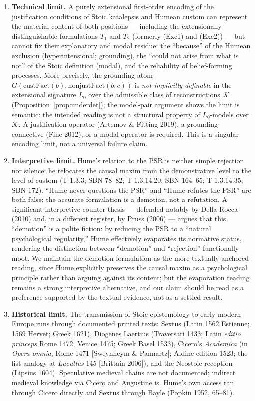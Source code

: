 \documentclass[11pt]{article}
\theoremstyle{plain}
\theoremstyle{definition}
\theoremstyle{remark}
\begin{document}
\begin{enumerate}
\item \textbf{Technical limit.} A purely extensional first-order
encoding of the justification conditions of Stoic katalepsis and Humean
custom can represent the material content of both positions ---
including the extensionally distinguishable formulations $T_1$ and
$T_2$ (formerly (Exc1) and (Exc2)) --- but cannot fix their explanatory
and modal residue: the ``because'' of the Humean exclusion
(hyperintensional; grounding), the ``could not arise from what is
not'' of the Stoic definition (modal), and the reliability of
belief-forming processes. More precisely, the grounding atom
$G(\mathrm{custFact}(b),\mathrm{nonjustFact}(b,c))$ is \emph{not
implicitly definable} in the extensional signature $L_0$ over the
admissible class of reconstructions $\mathcal K$
(Proposition~\ref{prop:underdet}); the model-pair argument shows the
limit is semantic: the intended reading is not a structural property of
$L_0$-models over $\mathcal K$. A justification operator (Artemov \&
Fitting 2019), a grounding connective (Fine 2012), or a modal operator
is required. This is a singular encoding limit, not a universal failure
claim.
\item \textbf{Interpretive limit.} Hume's relation to the PSR is
neither simple rejection nor silence: he relocates the causal maxim
from the demonstrative level to the level of custom (T 1.3.3; SBN
78--82; T 1.3.14.20; SBN 164--65; T 1.3.14.35; SBN 172). ``Hume never
questions the PSR'' and ``Hume refutes the PSR'' are both false; the
accurate formulation is a demotion, not a refutation. A significant
interpretive counter-thesis --- defended notably by Della Rocca (2010)
and, in a different register, by Pruss (2006) --- argues that this
``demotion'' is a polite fiction: by reducing the PSR to a ``natural
psychological regularity,'' Hume effectively evaporates its normative
status, rendering the distinction between ``demotion'' and
``rejection'' functionally moot. We maintain the demotion formulation
as the more textually anchored reading, since Hume explicitly preserves
the causal maxim as a psychological principle rather than arguing
against its content; but the evaporation reading remains a strong
interpretive alternative, and our claim should be read as a preference
supported by the textual evidence, not as a settled result.
\item \textbf{Historical limit.} The transmission of Stoic epistemology
to early modern Europe runs through documented printed texts: Sextus
(Latin 1562 Estienne; 1569 Hervet; Greek 1621), Diogenes Laertius
(Traversari 1433; Latin \emph{editio princeps} Rome 1472; Venice 1475;
Greek Basel 1533), Cicero's \emph{Academica} (in \emph{Opera omnia},
Rome 1471 [Sweynheym \& Pannartz]; Aldine edition 1523; the fist
analogy at \emph{Lucullus} 145 [Brittain 2006]), and the Neostoic
reception (Lipsius 1604). Speculative medieval chains are not
documented; indirect medieval knowledge via Cicero and Augustine is.
Hume's own access ran through Cicero directly and Sextus through Bayle
(Popkin 1952, 65--81).
\end{enumerate}
\end{document}
